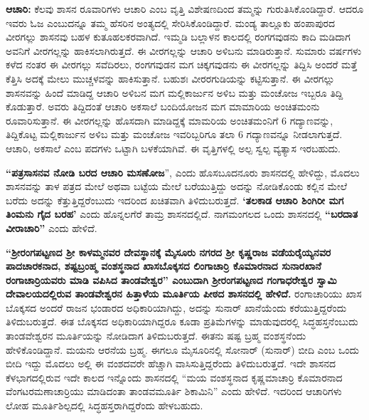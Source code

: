 \textbf{ಆಚಾರಿ:} ಕೆಲವು ಶಾಸನ ರೂವಾರಿಗಳು ಆಚಾರಿ ಎಂಬ ವೃತ್ತಿ ವಿಶೇಷಣದಿಂದ ತಮ್ಮನ್ನು ಗುರುತಿಸಿಕೊಂಡಿದ್ದಾರೆ. ಆದರೂ ಇವರು ಓಜ ಎಂಬುದನ್ನೂ ತಮ್ಮ ಹೆಸರಿನ ಅಂತ್ಯದಲ್ಲಿ ಸೇರಿಸಿಕೊಂಡಿದ್ದಾರೆ. ಮಂಡ್ಯ ತಾಲ್ಲೂಕು ಹಂಪಾಪುರದ ವೀರಗಲ್ಲು ಶಾಸನವು ಬಹಳ ಕುತೂಹಲಕರವಾಗಿದೆ. ಇಮ್ಮಡಿ ಬಲ್ಲಾಳನ ಕಾಲದಲ್ಲಿ ರಂಗಗವುಡನು ಕಾದಿ ಮಡಿದಾಗ ಅವನಿಗೆ ವೀರಗಲ್ಲನ್ನು ಹಾಕಿಸಲಾಗಿರುತ್ತದೆ. ಈ ವೀರಗಲ್ಲನ್ನು ಆಚಾರಿ ಅಳಿಬನು ಮಾಡಿರುತ್ತಾನೆ. ಸುಮಾರು ವರ್ಷಗಳು ಕಳೆದ ನಂತರ ಈ ವೀರಗಲ್ಲು ಸವೆದಿರಲು, ರಂಗಗವುಡನ ಮಗ ಚಿಕ್ಕಗವುಡನು ಈ ವೀರಗಲ್ಲನ್ನು ತಿದ್ದಿಸಿ ಅಂದರೆ ಮತ್ತೆ ಕೆತ್ತಿಸಿ ಅದಕ್ಕೆ ಮೇಲು ಮುಚ್ಚಳವನ್ನು ಹಾಕಿಸುತ್ತಾನೆ. ಬಹುಶಃ ವೀರರಗುಡಿಯನ್ನು ಕಟ್ಟಿಸುತ್ತಾನೆ. ಈ ವೀರಗಲ್ಲು ಶಾಸನವನ್ನು ಹಿಂದೆ ಮಾಡಿದ್ದ ಆಚಾರಿ ಅಳಿಬನ ಮಗ ಮಲ್ಲಿಕಾರ್ಜುನ ಅಳಿಬ ಮತ್ತು ಮಂಚೋಜ ಇಬ್ಬರೂ ತಿದ್ದಿ ಕೊಡುತ್ತಾರೆ. ಅವರು ತಿದ್ದಿದಂತೆ ಆಚಾರಿ ಅಕಸಾಲೆ ಬಂದಿಯೋಜನ ಮಗ ಮಾಮಾರಿಯ ಅಂಚಿತಮಂನು ರೂವಾರಿಸುತ್ತಾನೆ. ಈ ವೀರಗಲ್ಲನ್ನು ಹೊಸದಾಗಿ ಮಾಡಿದ್ದಕ್ಕೆ ಮಾಮರಿಯ ಅಂಚಿತಮಂನಿಗೆ 6 ಗದ್ಯಾಣವನ್ನು, ತಿದ್ದಿಕೊಟ್ಟ ಮಲ್ಲಿಕಾರ್ಜುನ ಅಳಿಬ ಮತ್ತು ಮಂಚೋಜ ಇವರಿಬ್ಬರಿಗೂ ತಲಾ 6 ಗದ್ಯಾಣವನ್ನೂ ನೀಡಲಾಗುತ್ತದೆ. ಆಚಾರಿ, ಅಕಸಾಲೆ ಎಂಬ ಪದಗಳು ಒಟ್ಟಾಗಿ ಬಳಕೆಯಾಗಿವೆ. ಈ ವೃತ್ತಿಗಳಲ್ಲಿ ಅಲ್ಪ ಸ್ವಲ್ಪ ವ್ಯತ್ಯಾಸ ಇರಬಹುದು.

\textbf{ “ಪತ್ರಸಾಸನವ ನೋಡಿ ಬರದ ಆಚಾರಿ ಮಸಣೋಜ}”, ಎಂದು ಹೊಸಬೂದನೂರು ಶಾಸನದಲ್ಲಿ ಹೇಳಿದ್ದು, ಮೊದಲು ಶಾಸನವನ್ನು ತಾಳ ಪತ್ರದ ಮೇಲೆ ಅಥವಾ ಬಟ್ಟೆಯ ಮೇಲೆ ಬರೆಯುತ್ತಿದ್ದು ಅದನ್ನು ನೋಡಿಕೊಂಡು ಕಲ್ಲಿನ ಮೇಲೆ ಬರೆದು ಅದನ್ನು ಕೆತ್ತುತ್ತಿದ್ದರೆಂಬುದು ಇದರಿಂದ ಖಚಿತವಾಗಿ ತಿಳಿದುಬರುತ್ತದೆ. \textbf{‘ತಲಕಾಡ ಆಚಾರಿ ಶಿಂಗಿರೀ ಮಗ ತಿಂಮನು ಗೈದ ಬರಹ’} ಎಂದು ಹೊನ್ನಲಗೆರೆ ತಾಮ್ರ ಶಾಸನದಲ್ಲಿದೆ. ನಾಗಮಂಗಲದ ಒಂದು ಶಾಸನದಲ್ಲಿ \textbf{“ಬರದಾತ ವೀರಾಚಾರಿ”} ಎಂದು ಹೇಳಿದೆ.

\textbf{“ಶ‍್ರೀರಂಗಪಟ್ಟಣದ ಶ‍್ರೀ ಕಾಳಮ್ಮನವರ ದೇವಸ್ಥಾನಕ್ಕೆ ಮೈಸೂರು ನಗರದ ಶ‍್ರೀ ಕೃಷ್ಣರಾಜ ವಡೆಯರೈಯ್ಯನವರ ಪಾದಚಾರಕನಾದ, ಶಷ್ಟಬ್ರಂಹ್ಮ ವಂಶಸ್ಥನಾದ ಖಾಸಬೊಕ್ಕಸದ ಲಿಂಗಾಚಾರ್ರಿ ಕೊಮಾರನಾದ ಸುನಾರಖಾನೆ ರಂಗಾಚಾರ್ರಿ\-ಯವರು ಮಾಡಿ ವಪಿಸಿದ ತಾಂಡವೇಶ್ವರ” ಎಂಬುದಾಗಿ ಶ‍್ರೀರಂಗಪಟ್ಟಣದ ಗಂಗಾಧರೇಶ್ವರ ಸ್ವಾಮಿ ದೇವಾಲಯದಲ್ಲಿರುವ ತಾಂಡವೇಶ್ವರನ ಹಿತ್ತಾಳೆಯ ಮೂರ್ತಿಯ ಪೀಠದ ಶಾಸನದಲ್ಲಿ ಹೇಳಿದೆ.} ರಂಗಾಚಾರಿಯು ಖಾಸ ಬೊಕ್ಕಸದ ಅಂದರೆ ರಾಜನ ಭಂಡಾರದ ಅಧಿಕಾರಿಯಾಗಿದ್ದು, ಅದನ್ನು ಸುನಾರ್​ ಖಾನೆಯೆಂದು ಕರೆಯುತ್ತಿದ್ದರೆಂದು ತಿಳಿದುಬರುತ್ತದೆ. ಈತ ಬೊಕ್ಕಸದ ಅಧಿಕಾರಿಯಾಗಿದ್ದರೂ ಕೂಡಾ ಪ್ರತಿಮೆಗಳನ್ನು ಮಾಡುವುದರಲ್ಲಿ ಸಿದ್ಧಹಸ್ತನೆಂಬುದು ತಾಂಡವೇಶ್ವರನ ಮೂರ್ತಿಯನ್ನು ನೋಡಿದಾಗ ತಿಳಿದುಬರುತ್ತದೆ. ಈತನು ಷಷ್ಟ ಬ್ರಹ್ಮ ವಂಶಸ್ಥನೆಂದು ಹೇಳಿಕೊಂಡಿದ್ದಾನೆ. ಮಯನು ಆರನೆಯ ಬ್ರಹ್ಮ. ಈಗಲೂ ಮೈಸೂರಿನಲ್ಲಿ ಸೋನಾರ್​ (ಸುನಾರ್​) ಬೀದಿ ಎಂಬ ಒಂದು ಬೀದಿ ಇದ್ದು ಮೊದಲು ಅಲ್ಲಿ ಈ ವಂಶದವರೇ ಹೆಚ್ಚಾಗಿ ವಾಸಿಸುತ್ತಿದ್ದರೆಂದು ತಿಳಿದುಬರುತ್ತದೆ. ಇದೇ ಶಾಸನದ ಕೆಳಭಾಗದಲ್ಲಿರುವ ಇದೇ ಕಾಲದ ಇನ್ನೊಂದು ಶಾಸನದಲ್ಲಿ “ಮಯ ವಂಶಸ್ಥನಾದ ಕೃಷ್ಣಮಾಚಾರ್ರಿ ಕೊಮಾರನಾದ ವೆಂಗಟರಮಣಾಚಾರ್ರಿಯು ಮಾಡಿದಂತಾ ತಾಂಡವಮೂರ್ತಿ ಶಿಕಾಮಿನಿ” ಎಂದು ಹೇಳಿದೆ. ಇದರಿಂದ ಆಚಾರಿಗಳು ಲೋಹ ಮೂರ್ತಿಶಿಲ್ಪದಲ್ಲಿ ಸಿದ್ಧಹಸ್ತರಾಗಿದ್ದರೆಂದು ಹೇಳಬಹುದು.

